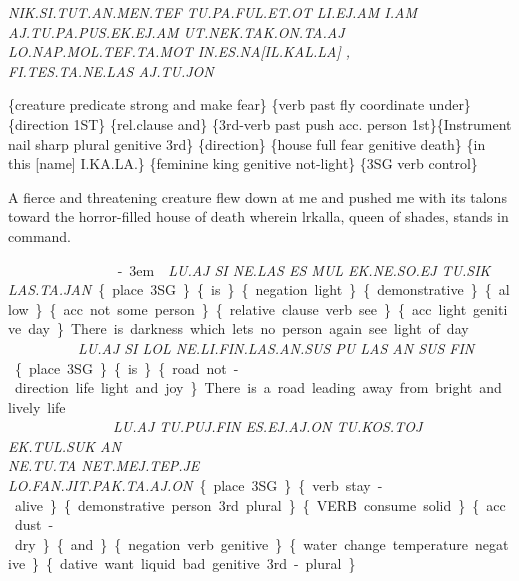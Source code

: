 {{\it NIK.SI.TUT.AN.MEN.TEF TU.PA.FUL.ET.OT LI.EJ.AM I.AM\\ AJ.TU.PA.PUS.EK.EJ.AM UT.NEK.TAK.ON.TA.AJ\\ LO.NAP.MOL.TEF.TA.MOT IN.ES.NA[IL.KAL.LA] ,\\FI.TES.TA.NE.LAS AJ.TU.JON }

\{creature predicate strong and make fear\} \{verb past fly coordinate under\} \{direction 1ST\} \{rel.clause and\} \{3rd-verb past push acc. person 1st\}\{Instrument nail sharp plural genitive 3rd\} \{direction\} \{house full fear genitive death\} \{in this [name] I.KA.LA.\} \{feminine king genitive not-light\} \{3SG verb control\} 

A fierce and threatening creature flew down at me and pushed me with its talons toward the horror-filled house of death wherein lrkalla, queen of shades, stands in command.  
 
 
\drie 

\es\aj ~ \si ~ \Atlanne\la ~ \es ~ \mul~\ek\Atlanne\so\ej~\tu\sik~\las\ta\jan\kern-3em\period

{\it LU.AJ SI NE.LAS ES MUL EK.NE.SO.EJ TU.SIK LAS.TA.JAN}

 \{place 3SG\} \{is\} \{negation light\} \{demonstrative\} \{allow\}\{acc. not some person\}\{relative clause verb see\}\{acc. light genitive day\} 

There is darkness which lets no person again see light of day.  

\drie 
 

\lu\aj ~ \si ~ \lol~ \Atlanne\li\fin\las\an\sus ~ \pu ~ \las ~ \an ~ \sus ~ \fin

{\it LU.AJ SI LOL NE.LI.FIN.LAS.AN.SUS PU LAS AN SUS FIN }

\{place 3SG\} \{is\}\{road not-direction life light and joy\} 

There is a road leading away from bright and lively life.  
 
\drie 

\lu\aj ~ \tu\puj\fin ~ \es\ej\aj\on ~  \tu\kos\toj ~ \ek\tul\suk ~ \an \\~ \Atlanne\tu\ta ~ \net\mep\tep\je ~ \lo\fan\jit\pak\ta\aj\on 

{\it LU.AJ TU.PUJ.FIN ES.EJ.AJ.ON  TU.KOS.TOJ EK.TUL.SUK AN \\NE.TU.TA NET.MEJ.TEP.JE LO.FAN.JIT.PAK.TA.AJ.ON}

\{place 3SG\} \{verb stay-alive\} \{demonstrative person 3rd plural\}\{VERB consume solid\}\{acc. dust-dry\} \{and\} \{negation verb genitive\} \{water change temperature negative\} \{dative want liquid bad genitive 3rd-plural\} 

}

